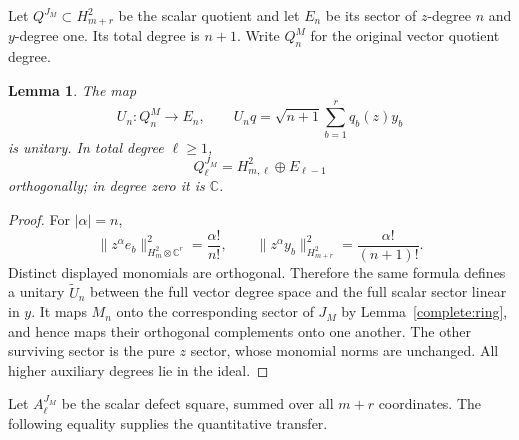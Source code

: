\documentclass[11pt,reqno]{amsart}
\numberwithin{equation}{section}
\newtheorem{lemma}[theorem]{Lemma}
\theoremstyle{definition}
\theoremstyle{remark}
\newcommand{\C}{\mathbb C}
\begin{document}
Let $Q^{J_M}\subset H_{m+r}^2$ be the scalar quotient and let $E_n$
be its sector of $z$-degree $n$ and $y$-degree one.  Its total degree is
$n+1$.  Write $Q_n^M$ for the original vector quotient degree.

\begin{lemma}\label{complete:unitary}
The map
\begin{equation}\label{eq:complete-unitary}
 U_n:Q_n^M\longrightarrow E_n,\qquad
 U_nq=\sqrt{n+1}\sum_{b=1}^r q_b(z)y_b
\end{equation}
is unitary.  In total degree $\ell\ge1$,
\[
 Q^{J_M}_\ell=H_{m,\ell}^2\oplus E_{\ell-1}
\]
orthogonally; in degree zero it is $\C$.
\end{lemma}
\begin{proof}
For $|\alpha|=n$,
\[
 \|z^\alpha e_b\|_{H_m^2\otimes\C^r}^2=\frac{\alpha!}{n!},
 \qquad
 \|z^\alpha y_b\|_{H_{m+r}^2}^2=\frac{\alpha!}{(n+1)!}.
\]
Distinct displayed monomials are orthogonal.  Therefore the same
formula defines a unitary $\widetilde U_n$ between the full vector
degree space and the full scalar sector linear in $y$.  It maps $M_n$
onto the corresponding sector of $J_M$ by Lemma~\ref{complete:ring},
and hence maps their orthogonal complements onto one another.
The other surviving sector is the pure $z$ sector, whose monomial norms
are unchanged.  All higher auxiliary degrees lie in the ideal.
\end{proof}

Let $A^{J_M}_\ell$ be the scalar defect square, summed over all
$m+r$ coordinates.  The following equality supplies the quantitative
transfer.
\end{document}
